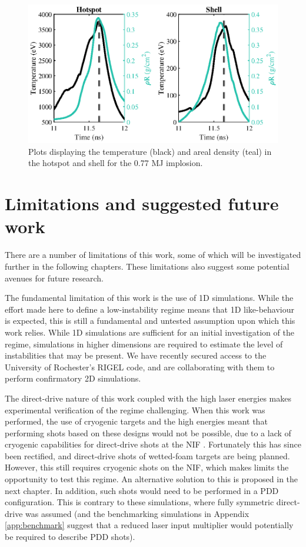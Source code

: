 \begin{figure}[ht]
\centering
\includegraphics{figures/LowCR/RhoRandT.eps}
\caption{Plots displaying the temperature (black) and areal density (teal) in the hotspot and shell for the 0.77 \unit{\mega\joule} implosion.}
\label{fig:HSandShellLMJ}
\end{figure}


\section{Limitations and suggested future work} \label{sec: LowCRLimitations}
There are a number of limitations of this work, some of which will be investigated further in the following chapters. These limitations also suggest some potential avenues for future research.

The fundamental limitation of this work is the use of 1D simulations. While the effort made here to define a low-instability regime means that 1D like-behaviour is expected, this is still a fundamental and untested assumption upon which this work relies. While 1D simulations are sufficient for an initial investigation of the regime, simulations in higher dimensions are required to estimate the level of instabilities that may be present. We have recently secured access to the University of Rochester's RIGEL code, and are collaborating with them to perform confirmatory 2D simulations.

The direct-drive nature of this work coupled with the high laser energies makes experimental verification of the regime challenging. When this work was performed, the use of cryogenic targets and the high energies meant that performing shots based on these designs would not be possible, due to a lack of cryogenic capabilities for direct-drive shots at the NIF \cite{Hohenberger2015}. Fortunately this has since been rectified, and direct-drive shots of wetted-foam targets are being planned. However, this still requires cryogenic shots on the NIF, which makes limits the opportunity to test this regime. An alternative solution to this is proposed in the next chapter. In addition, such shots would need to be performed in a PDD configuration. This is contrary to these simulations, where fully symmetric direct-drive was assumed (and the benchmarking simulations in Appendix \ref{app:benchmark} suggest that a reduced laser input multiplier would potentially be required to describe PDD shots).

